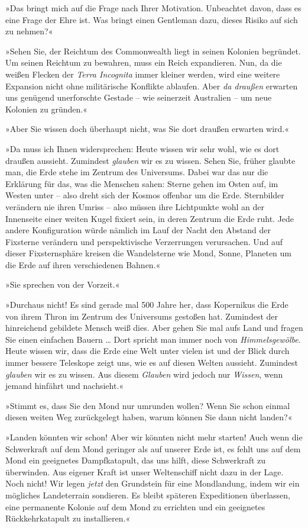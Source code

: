 »Das bringt mich auf die Frage nach Ihrer Motivation. Unbeachtet
davon, dass es eine Frage der Ehre ist. Was bringt einen Gentleman
dazu, dieses Risiko auf sich zu nehmen?«

»Sehen Sie, der Reichtum des Commonwealth liegt in seinen Kolonien
begründet. Um seinen Reichtum zu bewahren, muss ein Reich
expandieren. Nun, da die weißen Flecken der \emph{Terra Incognita}
immer kleiner werden, wird eine weitere Expansion nicht ohne
militärische Konflikte ablaufen. Aber \emph{da draußen} erwarten
uns genügend unerforschte Gestade – wie seinerzeit Australien – um
neue Kolonien zu gründen.«

»Aber Sie wissen doch überhaupt nicht, was Sie dort draußen
erwarten wird.«

»Da muss ich Ihnen widersprechen: Heute wissen wir sehr wohl, wie
es dort draußen aussieht. Zumindest \emph{glauben} wir es zu
wissen. Sehen Sie, früher glaubte man, die Erde stehe im Zentrum
des Universums. Dabei war das nur die Erklärung für das, was die
Menschen sahen: Sterne gehen im Osten auf, im Westen unter – also
dreht sich der Kosmos offenbar um die Erde. Sternbilder verändern
nie ihren Umriss – also müssen ihre Lichtpunkte wohl an der
Innenseite einer weiten Kugel fixiert sein, in deren Zentrum die
Erde ruht. Jede andere Konfiguration würde nämlich im Lauf der
Nacht den Abstand der Fixsterne verändern und perspektivische
Verzerrungen verursachen. Und auf dieser Fixsternsphäre kreisen die
Wandelsterne wie Mond, Sonne, Planeten um die Erde auf ihren
verschiedenen Bahnen.«

»Sie sprechen von der Vorzeit.«

»Durchaus nicht! Es sind gerade mal 500 Jahre her, dass Kopernikus
die Erde von ihrem Thron im Zentrum des Universums gestoßen hat.
Zumindest der hinreichend gebildete Mensch weiß dies. Aber gehen
Sie mal aufs Land und fragen Sie einen einfachen Bauern … Dort
spricht man immer noch von \emph{Himmelsgewölbe}. Heute wissen wir,
dass die Erde eine Welt unter vielen ist und der Blick durch immer
bessere Teleskope zeigt uns, wie es auf diesen Welten aussieht.
Zumindest \emph{glauben} wir es zu wissen. Aus diesem
\emph{Glauben} wird jedoch nur \emph{Wissen}, wenn jemand hinfährt
und nachsieht.«

»Stimmt es, dass Sie den Mond nur umrunden wollen? Wenn Sie schon
einmal diesen weiten Weg zurückgelegt haben, warum können Sie dann
nicht landen?«

»Landen könnten wir schon! Aber wir könnten nicht mehr starten!
Auch wenn die Schwerkraft auf dem Mond geringer als auf unserer
Erde ist, es fehlt uns auf dem Mond ein geeignetes Dampfkatapult,
das uns hilft, diese Schwerkraft zu überwinden. Aus eigener Kraft
ist unser Weltenschiff nicht dazu in der Lage. Noch nicht! Wir
legen \emph{jetzt} den Grundstein für eine Mondlandung, indem wir
ein mögliches Landeterrain sondieren. Es bleibt späteren
Expeditionen überlassen, eine permanente Kolonie auf dem Mond zu
errichten und ein geeignetes Rückkehrkatapult zu installieren.«

